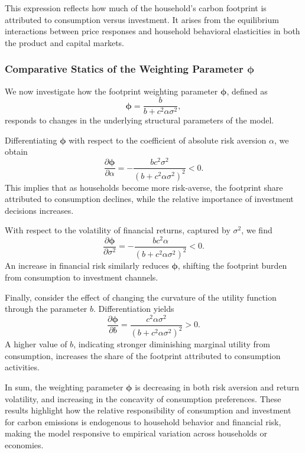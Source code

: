 \documentclass[12pt,a4paper]{article}%
\begin{document}
This expression reflects how much of the household’s carbon footprint is attributed to consumption versus investment. It arises from the equilibrium interactions between price responses and household behavioral elasticities in both the product and capital markets.

\subsubsection{Comparative Statics of the Weighting Parameter \( \boldsymbol{\phi} \)}

We now investigate how the footprint weighting parameter \( \boldsymbol{\phi} \), defined as
\[
\boldsymbol{\phi} = \frac{b}{b + c^2 \alpha \sigma^2},
\]
responds to changes in the underlying structural parameters of the model.

Differentiating \( \boldsymbol{\phi} \) with respect to the coefficient of absolute risk aversion \( \alpha \), we obtain
\[
\frac{\partial \boldsymbol{\phi}}{\partial \alpha} = -\frac{b c^2 \sigma^2}{{(b + c^2 \alpha \sigma^2)}^2} < 0.
\]
This implies that as households become more risk-averse, the footprint share attributed to consumption declines, while the relative importance of investment decisions increases.

With respect to the volatility of financial returns, captured by \( \sigma^2 \), we find
\[
\frac{\partial \boldsymbol{\phi}}{\partial \sigma^2} = -\frac{b c^2 \alpha}{{(b + c^2 \alpha \sigma^2)}^2} < 0.
\]
An increase in financial risk similarly reduces \( \boldsymbol{\phi} \), shifting the footprint burden from consumption to investment channels.

Finally, consider the effect of changing the curvature of the utility function through the parameter \( b \). Differentiation yields
\[
\frac{\partial \boldsymbol{\phi}}{\partial b} = \frac{c^2 \alpha \sigma^2}{{(b + c^2 \alpha \sigma^2)}^2} > 0.
\]
A higher value of \( b \), indicating stronger diminishing marginal utility from consumption, increases the share of the footprint attributed to consumption activities.

In sum, the weighting parameter \( \boldsymbol{\phi} \) is decreasing in both risk aversion and return volatility, and increasing in the concavity of consumption preferences. These results highlight how the relative responsibility of consumption and investment for carbon emissions is endogenous to household behavior and financial risk, making the model responsive to empirical variation across households or economies.
\end{document}
